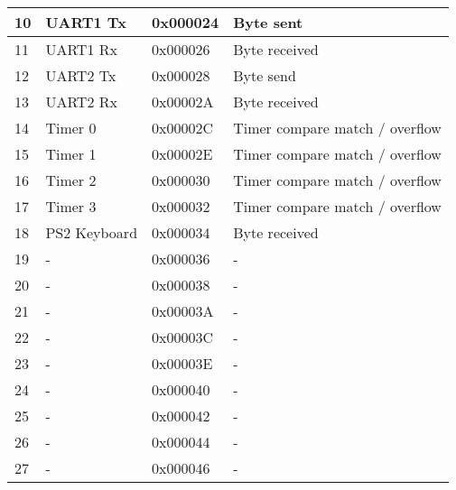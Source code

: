 \begin{table}[h]
\begin{tabular}{|l|l|l|l|}
        10                  & UART1 Tx            & 0x000024        & Byte sent                      \\ \hline
        11                  & UART1 Rx            & 0x000026        & Byte received                  \\ \hline
        12                  & UART2 Tx            & 0x000028        & Byte send                      \\ \hline
        13                  & UART2 Rx            & 0x00002A        & Byte received                  \\ \hline
        14                  & Timer 0             & 0x00002C        & Timer compare match / overflow \\ \hline
        15                  & Timer 1             & 0x00002E        & Timer compare match / overflow \\ \hline
        16                  & Timer 2             & 0x000030        & Timer compare match / overflow \\ \hline
        17                  & Timer 3             & 0x000032        & Timer compare match / overflow \\ \hline
        18                  & PS2 Keyboard        & 0x000034        & Byte received                  \\ \hline
        19                  & -                   & 0x000036        & -                              \\ \hline
        20                  & -                   & 0x000038        & -                              \\ \hline
        21                  & -                   & 0x00003A        & -                              \\ \hline
        22                  & -                   & 0x00003C        & -                              \\ \hline
        23                  & -                   & 0x00003E        & -                              \\ \hline
        24                  & -                   & 0x000040        & -                              \\ \hline
        25                  & -                   & 0x000042        & -                              \\ \hline
        26                  & -                   & 0x000044        & -                              \\ \hline
        27                  & -                   & 0x000046        & -                              \\ \hline

\end{tabular}
\end{table}

